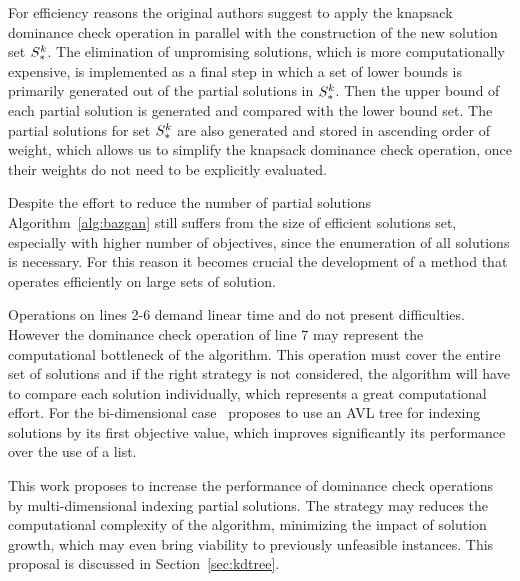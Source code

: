 For efficiency reasons the original authors
suggest to apply the knapsack dominance check operation
in parallel with the construction of the new solution set $S_*^k$.
The elimination of unpromising solutions, which is more
computationally expensive, is implemented as a final step in which
a set of lower bounds is primarily generated
out of the partial solutions in $S_*^k$.
Then the upper bound of each partial solution is
generated and compared with the lower bound set.
The partial solutions for set $S_*^k$ are also
generated and stored in ascending order of weight,
which allows us to simplify the knapsack dominance
check operation, once their weights do not need to be
explicitly evaluated.

Despite the effort to reduce the number of partial solutions
Algorithm~\ref{alg:bazgan} still suffers from the size of
efficient solutions set,
especially with higher number of objectives,
since the enumeration of all solutions is necessary.
For this reason it becomes crucial the development of a method that operates
efficiently on large sets of solution.

Operations on lines 2-6 demand linear time and do not present  difficulties.
However the dominance check operation of line 7
may represent the computational bottleneck of the algorithm.
This operation must cover the entire set of solutions and if the right
strategy is not considered, the algorithm will have to compare each solution
individually, which represents a great computational effort.
For the bi-dimensional case~\cite{bazgan2009} proposes to use an AVL tree for 
indexing solutions by its first objective value,
which improves significantly its performance over the use of a list.

This work proposes to increase the performance of dominance check operations
by multi-dimensional indexing partial solutions.
The strategy may reduces the computational complexity of the algorithm,
minimizing the impact of solution growth, which may even bring
viability to previously unfeasible instances.
This proposal is discussed in Section~\ref{sec:kdtree}.
